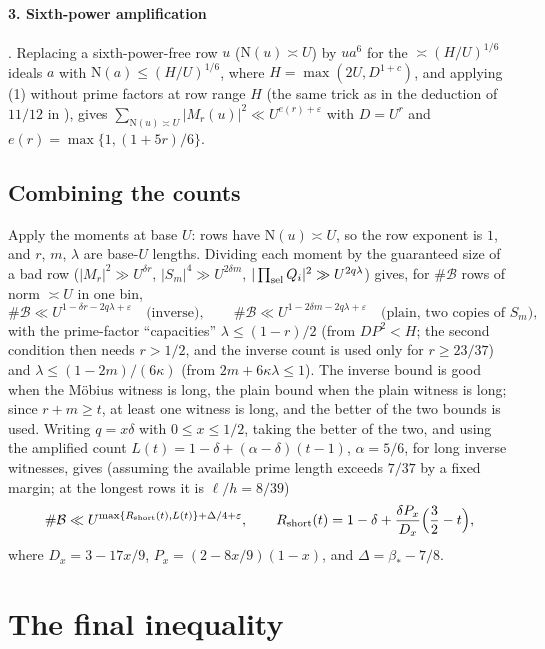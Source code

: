 \documentclass[11pt]{article}
\newcommand{\N}{\mathrm N}
\begin{document}
\paragraph{3. Sixth-power amplification}
\cite[Lemma lem:inverse-amplification]{OAI78}. Replacing a sixth-power-free row $u$ ($\N(u)\asymp U$) by
$ua^6$ for the $\asymp(H/U)^{1/6}$ ideals $a$ with $\N(a)\le(H/U)^{1/6}$, where
$H=\max(2U,D^{1+c})$, and applying (1) without prime factors at row range $H$ (the same trick
as in the deduction of $11/12$ in \cite{OAI1112,guide1112}), gives
$\sum_{\N(u)\asymp U}|M_r(u)|^2\ll U^{e(r)+\varepsilon}$ with $D=U^r$ and
$e(r)=\max\{1,(1+5r)/6\}$.

\subsection{Combining the counts}
Apply the moments at base $U$: rows have $\N(u)\asymp U$, so the row exponent is $1$, and $r$,
$m$, $\lambda$ are base-$U$ lengths. Dividing each moment by the guaranteed size of a bad row
($|M_r|^2\gg U^{\delta r}$, $|S_m|^4\gg U^{2\delta m}$, $|\prod_{\rm sel}Q_i|^2\gg U^{2q\lambda}$)
gives, for $\#\mathcal B$ rows of norm $\asymp U$ in one bin,
\[
 \#\mathcal B\ll U^{1-\delta r-2q\lambda+\varepsilon}\quad\text{(inverse)},\qquad
 \#\mathcal B\ll U^{1-2\delta m-2q\lambda+\varepsilon}\quad\text{(plain, two copies of }S_m),
\]
with the prime-factor ``capacities'' $\lambda\le(1-r)/2$ (from $DP^2<H$; the second condition
then needs $r>1/2$, and the inverse count is used only for $r\ge23/37$) and
$\lambda\le(1-2m)/(6\kappa)$ (from $2m+6\kappa\lambda\le1$).
The inverse bound is good when the M\"obius witness is long, the plain bound when the plain witness is long;
since $r+m\ge t$, at least one witness is long, and the better of the two bounds is used. Writing $q=x\delta$ with
$0\le x\le1/2$, taking the better of the two, and using the amplified count
$L(t)=1-\delta+(\alpha-\delta)(t-1)$, $\alpha=5/6$, for long inverse witnesses, gives
\cite[Prop.\ prop:detector-counts]{OAI78} (assuming the available prime length exceeds $7/37$ by a fixed
margin; at the longest rows it is $\ell/h=8/39$)
\[
 \#\mathcal B\ll U^{\max\{R_{\rm short}(t),L(t)\}+\Delta/4+\varepsilon},\qquad
 R_{\rm short}(t)=1-\delta+\frac{\delta P_x}{D_x}\Bigl(\frac32-t\Bigr),
\]
where $D_x=3-17x/9$, $P_x=(2-8x/9)(1-x)$, and $\Delta=\beta_*-7/8$.

\section{The final inequality}\label{sec:final}
\end{document}

